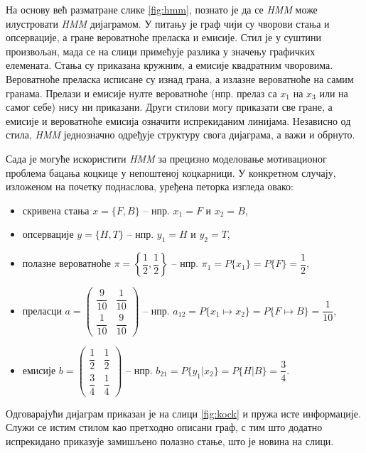 \documentclass[12pt,oneside]{memoir}
\begin{document}
\begin{CJK}{UTF8}{ipxm}
На основу већ разматране слике \ref{fig:hmm}, познато је да се \textit{HMM} може илустровати \textit{HMM} дијаграмом. У питању је граф чији су чворови стања и опсервације, а гране вероватноће преласка и емисије. Стил је у суштини произвољан, мада се на слици примећује разлика у значењу графичких елемената. Стања су приказана кружним, а емисије квадратним чворовима. Вероватноће преласка исписане су изнад грана, а излазне вероватноће на самим гранама. Прелази и емисије нулте вероватноће (нпр. прелаз са $x_1$ на $x_3$ или на самог себе) нису ни приказани. Други стилови могу приказати све гране, а емисије и вероватноће емисија означити испрекиданим линијама. Независно од стила, \textit{HMM} једнозначно одређује структуру свога дијаграма, а важи и обрнуто.

Сада је могуће искористити \textit{HMM} за прецизно моделовање мотивационог проблема бацања коцкице у непоштеној коцкарници. У конкретном случају, изложеном на почетку поднаслова, уређена петорка изгледа овако:
\begin{itemize}
  \item скривена стања $x = \{F, B\}$ -- нпр. $x_1 = F$ и $x_2 = B$,
  \item опсервације $y = \{H, T\}$ -- нпр. $y_1 = H$ и $y_2 = T$,
  \item полазне вероватноће $\pi = \left\{\dfrac{1}{2}, \dfrac{1}{2}\right\}$ -- нпр. $\pi_1 = P\{x_1\} = P\{F\} = \dfrac{1}{2}$,
  \item преласци $a = \left(\begin{matrix}\dfrac{9}{10} & \dfrac{1}{10}\\[8pt] \dfrac{1}{10} & \dfrac{9}{10}\end{matrix}\right)$ -- нпр. $a_{12} = P\{x_1 \mapsto x_2\} = P\{F \mapsto B\} = \dfrac{1}{10}$,
  \item емисије $b = \left(\begin{matrix}\dfrac{1}{2} & \dfrac{1}{2}\\[8pt] \dfrac{3}{4} & \dfrac{1}{4}\end{matrix}\right)$ -- нпр. $b_{21} = P\{y_1 | x_2\} = P\{H | B\} = \dfrac{3}{4}$.
\end{itemize}
Одговарајући дијаграм приказан је на слици \ref{fig:kock} и пружа исте информације. Служи се истим стилом као претходно описани граф, с тим што додатно испрекидано приказује замишљено полазно стање, што је новина на слици.


\end{CJK}
\end{document}
